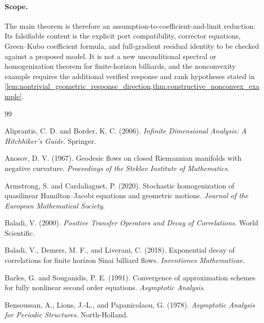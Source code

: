 \documentclass[12pt, letterpaper]{amsart}
\theoremstyle{plain}
\theoremstyle{definition}
\theoremstyle{remark}
\begin{document}
\paragraph{Scope.}
The main theorem is therefore an assumption-to-coefficient-and-limit reduction.
Its falsifiable content is the explicit port compatibility, corrector equations,
Green--Kubo coefficient formula, and full-gradient residual identity to be
checked against a proposed model.  It is not a new unconditional spectral or
homogenization theorem for finite-horizon billiards, and the nonconvexity example
requires the additional verified response and rank hypotheses stated in
\cref{lem:nontrivial_geometric_response_direction,thm:constructive_nonconvex_example}.

\begin{thebibliography}{99}

Aliprantis, C. D. and Border, K. C. (2006).
\newblock \emph{Infinite Dimensional Analysis: A Hitchhiker's Guide}.
\newblock Springer.

Anosov, D. V. (1967).
\newblock Geodesic flows on closed Riemannian manifolds with negative curvature.
\newblock \emph{Proceedings of the Steklov Institute of Mathematics}.

Armstrong, S. and Cardaliaguet, P. (2020).
\newblock Stochastic homogenization of quasilinear Hamilton--Jacobi equations and geometric motions.
\newblock \emph{Journal of the European Mathematical Society}.

Baladi, V. (2000).
\newblock \emph{Positive Transfer Operators and Decay of Correlations}.
\newblock World Scientific.

Baladi, V., Demers, M. F., and Liverani, C. (2018).
\newblock Exponential decay of correlations for finite horizon Sinai billiard flows.
\newblock \emph{Inventiones Mathematicae}.

Barles, G. and Souganidis, P. E. (1991).
\newblock Convergence of approximation schemes for fully nonlinear second order equations.
\newblock \emph{Asymptotic Analysis}.

Bensoussan, A., Lions, J.-L., and Papanicolaou, G. (1978).
\newblock \emph{Asymptotic Analysis for Periodic Structures}.
\newblock North-Holland.


\end{thebibliography}
\end{document}
